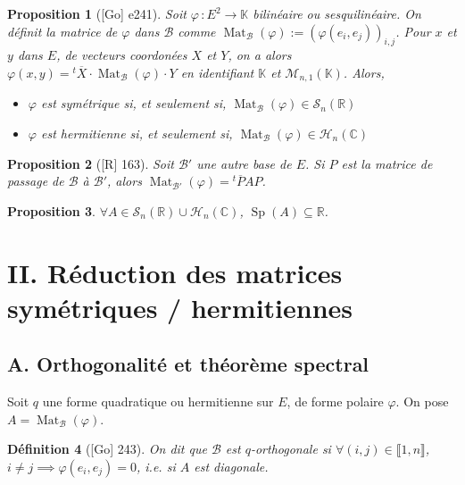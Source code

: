 \documentclass[10pt, a4paper, parskip=full, twoside, twocolumn]{report}
\newtheorem{definition}{Définition}
\newtheorem{proposition}[definition]{Proposition}
\newcommand{\IK}{\mathbb{K}}
\newcommand{\IC}{\mathbb{C}}
\newcommand{\IR}{\mathbb{R}}
\newcommand{\M}{\mathcal{M}}
\newcommand{\B}{\mathcal{B}}
\DeclareMathOperator{\Mat}{Mat}
\DeclareMathOperator{\Sp}{Sp}
\begin{document}
\begin{proposition}[\textnormal{[Go] e241}]
	Soit $\varphi\,\colon E^2\to \IK$ bilinéaire ou sesquilinéaire. On définit la \emph{matrice de $\varphi$ dans $\B$} comme $\Mat_{\B}(\varphi):= \left(\varphi(e_i,e_j)\right)_{i,j}$.
	Pour $x$ et $y$ dans $E$, de vecteurs coordonées $X$ et $Y$, on a alors $\varphi(x,y)={}^t\overline{X}\cdot \Mat_{\B}(\varphi)\cdot Y$ en identifiant $\IK$ et $\M_{n,1}(\IK)$.
	Alors, 
	\begin{itemize}
		\item $\varphi$ est symétrique si, et seulement si, $\Mat_{\B}(\varphi)\in \mathcal{S}_n(\IR)$
		\item $\varphi$ est hermitienne si, et seulement si, $\Mat_{\B}(\varphi)\in \mathcal{H}_n(\IC)$
	\end{itemize}
\end{proposition}

\begin{proposition}[\textnormal{[R] 163}]
	Soit $\B'$ une autre base de $E$. Si $P$ est la matrice de passage de $\B$ à $\B'$, alors $\Mat_{\B'}(\varphi)={}^t\overline{P}AP$.
\end{proposition}

\begin{proposition}
	$\forall A\in\mathcal{S}_n(\IR)\cup \mathcal{H}_n(\IC)$, $\Sp(A)\subseteq \IR$.
\end{proposition}

\section*{II. Réduction des matrices symétriques / hermitiennes}
\subsection*{A. Orthogonalité et théorème spectral}
\textcolor{paragraphtext}{Soit $q$ une forme quadratique ou hermitienne sur $E$, de forme polaire $\varphi$. On pose $A =\Mat_{\B}(\varphi)$.}

\begin{definition}[\textnormal{[Go] 243}]
	On dit que $\B$ est \emph{$q$-orthogonale} si $\forall(i,j)\in\llbracket 1,n\rrbracket$, $i\neq j\implies \varphi(e_i, e_j) = 0$, \emph{i.e.} si $A$ est diagonale.
\end{definition}
\end{document}

